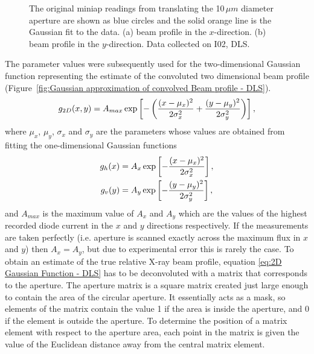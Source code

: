 \begin{figure}
\begin{subfigure}[b]{1.0\textwidth}
                \caption{}
                \label{figfity}
        \end{subfigure}
        \caption[Aperture scan measurements and the Gaussian fits to the data.]{The original miniap readings from translating the 10$\,\mu m$ diameter aperture are shown as blue circles and the solid orange line is the Gaussian fit to the data.
        (a) beam profile in the $x$-direction.
        (b) beam profile in the $y$-direction.
        Data collected on I02, DLS.}
        \label{figgfit}
\end{figure}
The parameter values were subsequently used for the two-dimensional Gaussian function representing the estimate of the convoluted two dimensional beam profile (Figure~\ref{fig:Gaussian approximation of convolved Beam profile - DLS}).
\begin{equation}
g_{2D}(x,y) = A_{max}\exp\left[-\left(\frac{(x - \mu_x)^2}{2\sigma_x^2} + \frac{(y - \mu_y)^2}{2\sigma_y^2}\right)\right],
\label{eq:2D Gaussian Function - DLS}
\end{equation}
where $\mu_x$, $\mu_y$, $\sigma_x$ and $\sigma_y$ are the parameters whose values are obtained from fitting the one-dimensional Gaussian functions
\begin{align}
g_h(x) &= A_{x}\exp\left[-\frac{(x - \mu_x)^2}{2\sigma_x^2}\right], \label{eq:1D Guassian Function x} \\
g_v(y) &= A_{y}\exp\left[-\frac{(y - \mu_y)^2}{2\sigma_y^2}\right], \label{eq:1D Guassian Function y}
\end{align}
and $A_{max}$ is the maximum value of $A_{x}$ and $A_{y}$ which are the values of the highest recorded diode current in the $x$ and $y$ directions respectively.
If the measurements are taken perfectly (i.e. aperture is scanned exactly across the maximum flux in $x$ and $y$) then $A_{x} = A_{y}$, but due to experimental error this is rarely the case.
\newline
To obtain an estimate of the true relative X-ray beam profile, equation \ref{eq:2D Gaussian Function - DLS} has to be deconvoluted with a matrix that corresponds to the aperture.
The aperture matrix is a square matrix created just large enough to contain the area of the circular aperture.
It essentially acts as a mask, so elements of the matrix contain the value 1 if the area is inside the aperture, and 0 if the element is outside the aperture.
To determine the position of a matrix element with respect to the aperture area, each point in the matrix is given the value of the Euclidean distance away from the central matrix element.
